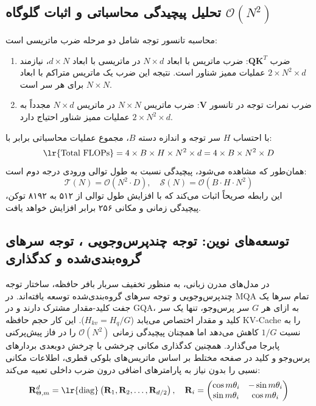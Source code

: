 \documentclass[12pt,a4paper]{report}
\theoremstyle{definition}
\begin{document}
\subsection{تحلیل پیچیدگی محاسباتی و اثبات گلوگاه $\mathcal{O}(N^2)$}
محاسبه تانسور توجه شامل دو مرحله ضرب ماتریسی است:
\begin{enumerate}
    \item ضرب $\mathbf{Q}\mathbf{K}^T$: ضرب ماتریس با ابعاد $N \times d$ در ماتریسی با ابعاد $d \times N$، نیازمند $2 \times N^2 \times d$ عملیات ممیز شناور  است. نتیجه این ضرب یک ماتریس متراکم با ابعاد $N \times N$ برای هر سر است.
    \item ضرب نمرات توجه در تانسور $\mathbf{V}$: ضرب ماتریس $N \times N$ در ماتریس $N \times d$ مجدداً به $2 \times N^2 \times d$ عملیات ممیز شناور احتیاج دارد.
\end{enumerate}
با احتساب $H$ سر توجه و اندازه دسته $B$، مجموع عملیات محاسباتی برابر با:
\begin{equation}
\text{\lr{Total FLOPs}} = 4 \times B \times H \times N^2 \times d = 4 \times B \times N^2 \times D
\end{equation}
همان‌طور که مشاهده می‌شود، پیچیدگی نسبت به طول توالی ورودی درجه دوم است:
\begin{equation}
\mathcal{T}(N) = \mathcal{O}(N^2 \cdot D), \quad \mathcal{S}(N) = \mathcal{O}(B \cdot H \cdot N^2)
\end{equation}
این رابطه صریحاً اثبات می‌کند که با افزایش طول توالی از ۵۱۲ به ۸۱۹۲ توکن، پیچیدگی زمانی و مکانی ۲۵۶ برابر افزایش خواهد یافت.

\subsection{توسعه‌های نوین: توجه چندپرس‌وجویی ، توجه سرهای گروه‌بندی‌شده  و کدگذاری }
در مدل‌های مدرن زبانی، به منظور تخفیف سربار بافر حافظه، ساختار توجه چندپرس‌وجویی  \cite{shazeer2019fast} و توجه سرهای گروه‌بندی‌شده  \cite{ainslie2023gqa} توسعه یافته‌اند. در MQA تمام سرها یک جفت کلید-مقدار مشترک دارند و در GQA، به ازای هر $G$ سر پرس‌وجو، تنها یک سر کلید و مقدار اختصاص می‌یابد ($H_{kv} = H_q / G$). این کار حجم حافظه KV-Cache را به نسبت $1/G$ کاهش می‌دهد اما همچنان پیچیدگی زمانی $\mathcal{O}(N^2)$ را در فاز پیش‌پرکنی  پابرجا می‌گذارد. همچنین کدگذاری مکانی چرخشی  \cite{su2024roformer} با چرخش دوبعدی بردارهای پرس‌وجو و کلید در صفحه مختلط بر اساس ماتریس‌های بلوکی قطری، اطلاعات مکانی نسبی را بدون نیاز به پارامترهای اضافی درون ضرب داخلی تعبیه می‌کند:
\begin{equation}
\mathbf{R}_{\Theta, m}^d = \text{\lr{diag}}\left( \mathbf{R}_1, \mathbf{R}_2, \dots, \mathbf{R}_{d/2} \right), \quad \mathbf{R}_i = \begin{pmatrix} \cos m\theta_i & -\sin m\theta_i \\ \sin m\theta_i & \cos m\theta_i \end{pmatrix}
\end{equation}
\end{document}
